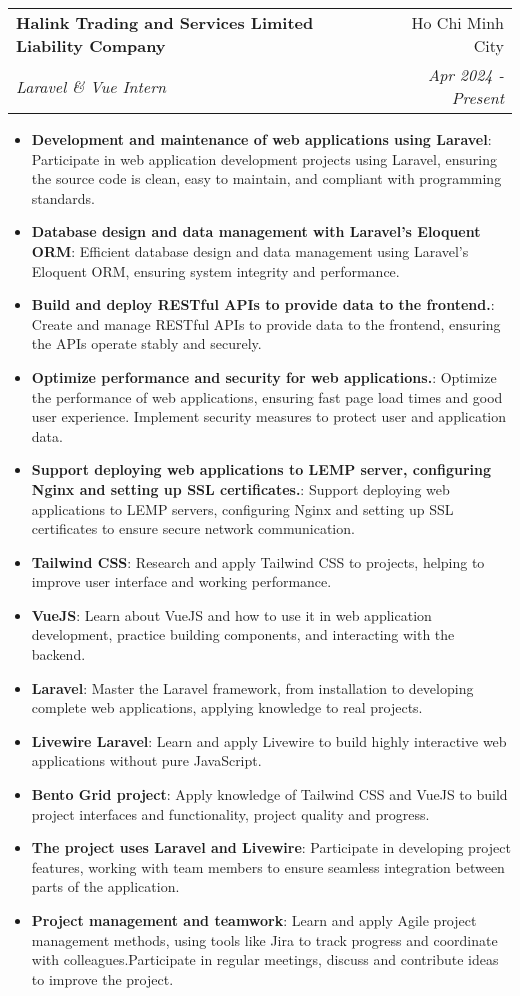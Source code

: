 \documentclass[letterpaper,11pt]{article}
\makeatletter
\newcommand{\resumeItem}[2]{
  \item\small{
    \textbf{#1}{: #2 \vspace{-2pt}}
  }
}
\newcommand{\resumeSubheading}[4]{
  \vspace{-1pt}\item
    \begin{tabular*}{0.97\textwidth}{l@{\extracolsep{\fill}}r}
      \textbf{#1} & #2 \\
      \textit{\small#3} & \textit{\small #4} \\
    \end{tabular*}\vspace{-5pt}
}
\newcommand{\resumeItemListStart}{\begin{itemize}}
\newcommand{\resumeItemListEnd}{\end{itemize}\vspace{-5pt}}
\makeatother
\begin{document}
    \resumeSubheading
      {Halink Trading and Services Limited Liability Company}{Ho Chi Minh City}
      {Laravel \& Vue Intern}{Apr 2024 - Present}
      \resumeItemListStart
        \resumeItem{Development and maintenance of web applications using Laravel}{Participate in web application development projects using Laravel, ensuring the source code is clean, easy to maintain, and compliant with programming standards.}
        \resumeItem{Database design and data management with Laravel's Eloquent ORM}{Efficient database design and data management using Laravel's Eloquent ORM, ensuring system integrity and performance.}
        \resumeItem{Build and deploy RESTful APIs to provide data to the frontend.}{Create and manage RESTful APIs to provide data to the frontend, ensuring the APIs operate stably and securely.}
        \resumeItem{Optimize performance and security for web applications.}{Optimize the performance of web applications, ensuring fast page load times and good user experience. Implement security measures to protect user and application data.}
        \resumeItem{Support deploying web applications to LEMP server, configuring Nginx and setting up SSL certificates.}{Support deploying web applications to LEMP servers, configuring Nginx and setting up SSL certificates to ensure secure network communication.}
        \resumeItem{Tailwind CSS}{Research and apply Tailwind CSS to projects, helping to improve user interface and working performance.}
        \resumeItem{VueJS}{Learn about VueJS and how to use it in web application development, practice building components, and interacting with the backend.}
        \resumeItem{Laravel}{Master the Laravel framework, from installation to developing complete web applications, applying knowledge to real projects.}
        \resumeItem{Livewire Laravel}{Learn and apply Livewire to build highly interactive web applications without pure JavaScript.}\resumeItem{Bento Grid project}{Apply knowledge of Tailwind CSS and VueJS to build project interfaces and functionality, project quality and progress.}
        \resumeItem{The project uses Laravel and Livewire}{Participate in developing project features, working with team members to ensure seamless integration between parts of the application.}
        \resumeItem{Project management and teamwork}{Learn and apply Agile project management methods, using tools like Jira to track progress and coordinate with colleagues.Participate in regular meetings, discuss and contribute ideas to improve the project.}
      \resumeItemListEnd
\end{document}
